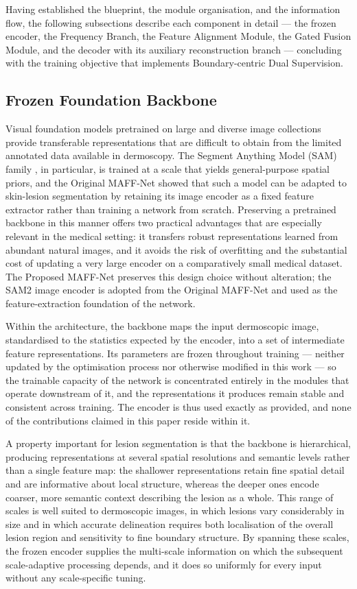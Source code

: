 Having established the blueprint, the module organisation, and the information flow, the following subsections describe each component in detail --- the frozen encoder, the Frequency Branch, the Feature Alignment Module, the Gated Fusion Module, and the decoder with its auxiliary reconstruction branch --- concluding with the training objective that implements Boundary-centric Dual Supervision.

\subsection{Frozen Foundation Backbone}

Visual foundation models pretrained on large and diverse image collections provide transferable representations that are difficult to obtain from the limited annotated data available in dermoscopy. The Segment Anything Model (SAM) family \cite{ref9}, in particular, is trained at a scale that yields general-purpose spatial priors, and the Original MAFF-Net showed that such a model can be adapted to skin-lesion segmentation by retaining its image encoder as a fixed feature extractor rather than training a network from scratch. Preserving a pretrained backbone in this manner offers two practical advantages that are especially relevant in the medical setting: it transfers robust representations learned from abundant natural images, and it avoids the risk of overfitting and the substantial cost of updating a very large encoder on a comparatively small medical dataset. The Proposed MAFF-Net preserves this design choice without alteration; the SAM2 image encoder \cite{ref10} is adopted from the Original MAFF-Net and used as the feature-extraction foundation of the network.

Within the architecture, the backbone maps the input dermoscopic image, standardised to the statistics expected by the encoder, into a set of intermediate feature representations. Its parameters are frozen throughout training --- neither updated by the optimisation process nor otherwise modified in this work --- so the trainable capacity of the network is concentrated entirely in the modules that operate downstream of it, and the representations it produces remain stable and consistent across training. The encoder is thus used exactly as provided, and none of the contributions claimed in this paper reside within it.

A property important for lesion segmentation is that the backbone is hierarchical, producing representations at several spatial resolutions and semantic levels rather than a single feature map: the shallower representations retain fine spatial detail and are informative about local structure, whereas the deeper ones encode coarser, more semantic context describing the lesion as a whole. This range of scales is well suited to dermoscopic images, in which lesions vary considerably in size and in which accurate delineation requires both localisation of the overall lesion region and sensitivity to fine boundary structure. By spanning these scales, the frozen encoder supplies the multi-scale information on which the subsequent scale-adaptive processing depends, and it does so uniformly for every input without any scale-specific tuning.

